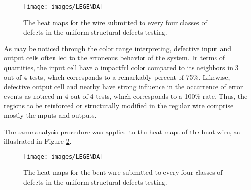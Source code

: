 \begin{figure}[!ht]
\center
{}
\hfill
{}
\hfill
{}
\hfill
{}
\linebreak
{\texttt{[image: images/LEGENDA]}
}
\caption{The heat maps for the wire submitted to every four classes of defects in the uniform structural defects testing.}
\label{figure:reg_wire_uniform}
\end{figure}

As may be noticed through the color range interpreting, defective input and output cells often led to the erroneous behavior of the system. In terms of quantities, the input cell have a impactful color compared to its neighbors in 3 out of 4 tests, which corresponds to a remarkably percent of 75\%.  Likewise, defective output cell and nearby have strong influence in the occurrence of error events as noticed in 4 out of 4 tests, which corresponds to a 100\% rate. Thus, the regions to be reinforced or structurally modified in the regular wire comprise mostly the inputs and outputs.

The same analysis procedure was applied to the heat maps of the bent wire, as illustrated in Figure \ref{figure:reg_bentwire_uniform}.

\begin{figure}[!ht]
\center
{}
\hfill
{}
\hfill
{}
\hfill
{}
\linebreak
{\texttt{[image: images/LEGENDA]}
}
\caption{The heat maps for the bent wire submitted to every four classes of defects in the uniform structural defects testing.}
\label{figure:reg_bentwire_uniform}
\end{figure}

